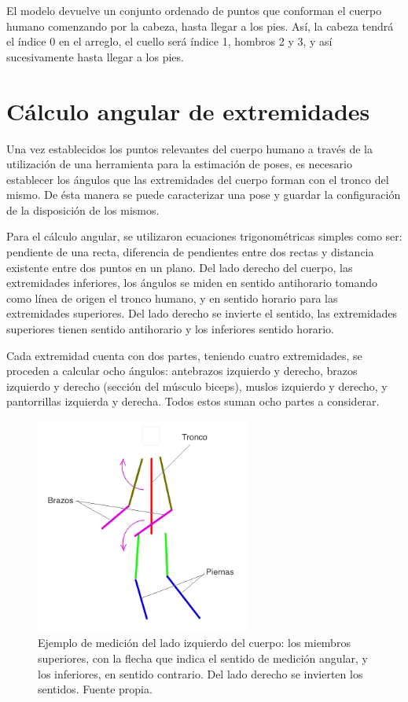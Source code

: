 \documentclass[a4paper,12pt,oneside,spanish]{book}
\begin{document}
El modelo devuelve un conjunto ordenado de puntos que conforman el cuerpo humano comenzando por la cabeza, hasta llegar a los pies. Así, la cabeza tendrá el índice 0 en el arreglo, el cuello será índice 1, hombros 2 y 3, y así sucesivamente hasta llegar a los pies.\par

\section{Cálculo angular de extremidades}\label{calculoangular}

Una vez establecidos los puntos relevantes del cuerpo humano a través de la utilización de una herramienta para la estimación de poses, es necesario establecer los ángulos que las extremidades del cuerpo forman con el tronco del mismo. De ésta manera se puede caracterizar una pose y guardar la configuración de la disposición de los mismos.\par 

Para el cálculo angular, se utilizaron ecuaciones trigonométricas simples como ser: pendiente de una recta, diferencia de pendientes entre dos rectas y distancia existente entre dos puntos en un plano. Del lado derecho del cuerpo, las extremidades inferiores, los ángulos se miden en sentido antihorario tomando como línea de origen el tronco humano, y en sentido horario para las extremidades superiores. Del lado derecho se invierte el sentido, las extremidades superiores tienen sentido antihorario y los inferiores sentido horario.\par

Cada extremidad cuenta con dos partes, teniendo cuatro extremidades, se proceden a calcular ocho ángulos: antebrazos izquierdo y derecho, brazos izquierdo y derecho (sección del músculo biceps), muslos izquierdo y derecho, y pantorrillas izquierda y derecha. Todos estos suman ocho partes a considerar.\par

\begin{figure}[h!]
	\includegraphics[width=200pt]{Imagenes/pose6.jpg}
	\centering	
	\caption{Ejemplo de medición del lado izquierdo del cuerpo: los miembros superiores, con la flecha que indica el sentido de medición angular, y los inferiores, en sentido contrario. Del lado derecho se invierten los sentidos. Fuente propia.}
	\label{fig:pose5}
\end{figure}
\end{document}
